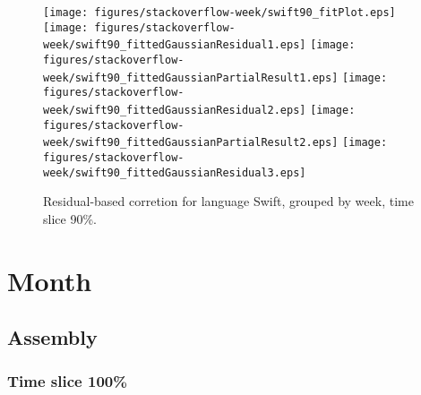 \begin{figure}[t]
\centering
{}
{\texttt{[image: figures/stackoverflow-week/swift90\_fitPlot.eps]}}
{\texttt{[image: figures/stackoverflow-week/swift90\_fittedGaussianResidual1.eps]}}
{\texttt{[image: figures/stackoverflow-week/swift90\_fittedGaussianPartialResult1.eps]}}
{\texttt{[image: figures/stackoverflow-week/swift90\_fittedGaussianResidual2.eps]}}
{\texttt{[image: figures/stackoverflow-week/swift90\_fittedGaussianPartialResult2.eps]}}
{\texttt{[image: figures/stackoverflow-week/swift90\_fittedGaussianResidual3.eps]}}
\caption{Residual-based corretion for language Swift, grouped by week, time slice 90\%.}
\end{figure}


\FloatBarrier


\section{Month}

\subsection{Assembly}

\subsubsection{Time slice 100\%}

